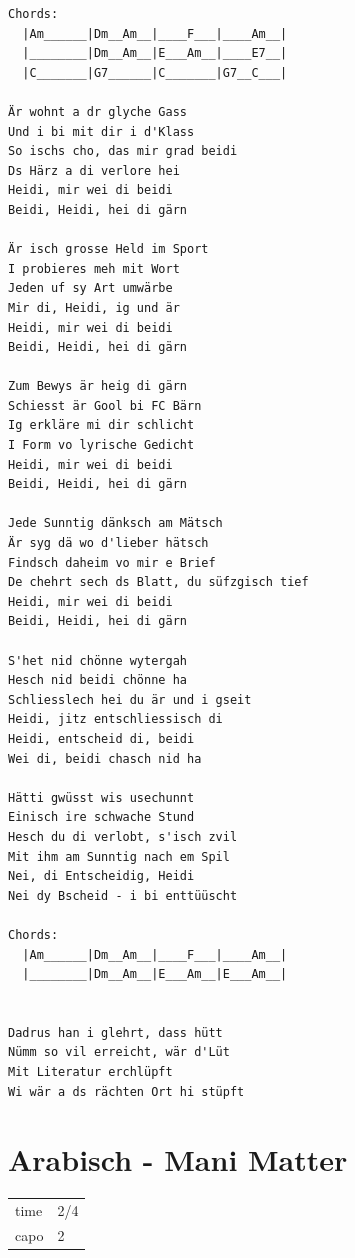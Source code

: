 \documentclass[
]{book}
\let\stdsection\section
\renewcommand\section{\clearpage\stdsection}
\begin{document}
\begin{verbatim}
Chords:
  |Am______|Dm__Am__|____F___|____Am__|
  |________|Dm__Am__|E___Am__|____E7__|
  |C_______|G7______|C_______|G7__C___|

Är wohnt a dr glyche Gass
Und i bi mit dir i d'Klass
So ischs cho, das mir grad beidi
Ds Härz a di verlore hei
Heidi, mir wei di beidi
Beidi, Heidi, hei di gärn

Är isch grosse Held im Sport
I probieres meh mit Wort
Jeden uf sy Art umwärbe
Mir di, Heidi, ig und är
Heidi, mir wei di beidi
Beidi, Heidi, hei di gärn

Zum Bewys är heig di gärn
Schiesst är Gool bi FC Bärn
Ig erkläre mi dir schlicht
I Form vo lyrische Gedicht
Heidi, mir wei di beidi
Beidi, Heidi, hei di gärn

Jede Sunntig dänksch am Mätsch
Är syg dä wo d'lieber hätsch
Findsch daheim vo mir e Brief
De chehrt sech ds Blatt, du süfzgisch tief
Heidi, mir wei di beidi
Beidi, Heidi, hei di gärn

S'het nid chönne wytergah
Hesch nid beidi chönne ha
Schliesslech hei du är und i gseit
Heidi, jitz entschliessisch di
Heidi, entscheid di, beidi
Wei di, beidi chasch nid ha

Hätti gwüsst wis usechunnt
Einisch ire schwache Stund
Hesch du di verlobt, s'isch zvil
Mit ihm am Sunntig nach em Spil
Nei, di Entscheidig, Heidi
Nei dy Bscheid - i bi enttüüscht

Chords:
  |Am______|Dm__Am__|____F___|____Am__|
  |________|Dm__Am__|E___Am__|E___Am__|


Dadrus han i glehrt, dass hütt
Nümm so vil erreicht, wär d'Lüt
Mit Literatur erchlüpft
Wi wär a ds rächten Ort hi stüpft
\end{verbatim}

\hypertarget{mundart-und-deutsch-arabisch}{%
\section{Arabisch - Mani Matter}\label{mundart-und-deutsch-arabisch}}

\begin{longtable}[]{@{}ll@{}}
\toprule
\endhead
time & 2/4\tabularnewline
capo & 2\tabularnewline
\bottomrule
\end{longtable}
\end{document}
